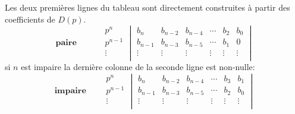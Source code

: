 Les deux premières lignes du tableau sont directement construites à partir 
des coefficients de $D(p)$.
\[
    \textbf{paire}\qquad\quad
\begin{matrix}
    p^n    \\
    p^{n-1}\\
    \hline
    \vdots \\
\end{matrix}
\begin{vmatrix}
    b_n       & b_{n-2}    & b_{n-4}    & \cdots & b_2        & b_0  \\
    b_{n-1}   & b_{n-3}    & b_{n-5}    & \cdots & b_1        & 0    \\
    \hline
    \vdots    & \vdots     & \vdots     & \vdots & \vdots     & \vdots  \\
\end{vmatrix}
\]
si $n$ est impaire la dernière colonne de la seconde ligne est non-nulle:
\[
    \textbf{impaire}\qquad
\begin{matrix}
    p^n    \\
    p^{n-1}\\
    \hline
    \vdots \\
\end{matrix}
\begin{vmatrix}
    b_n       & b_{n-2}    & b_{n-4}    & \cdots & b_3            & b_1    \\
    b_{n-1}   & b_{n-3}    & b_{n-5}    & \cdots & b_2            & b_0    \\
    \hline
    \vdots    & \vdots     & \vdots     & \vdots & \vdots         & \vdots \\
\end{vmatrix}
\]

